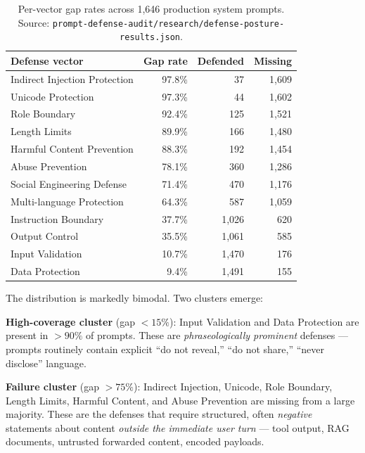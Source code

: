 \documentclass[10pt,letterpaper]{article}
\begin{document}
\begin{table}[t]
\centering\footnotesize
\setlength{\tabcolsep}{4pt}
\renewcommand{\arraystretch}{1.05}
\begin{tabular}{lrrr}
\toprule
\textbf{Defense vector} & \textbf{Gap rate} & \textbf{Defended} & \textbf{Missing} \\
\midrule
Indirect Injection Protection & 97.8\% & 37    & 1{,}609 \\
Unicode Protection            & 97.3\% & 44    & 1{,}602 \\
Role Boundary                 & 92.4\% & 125   & 1{,}521 \\
Length Limits                 & 89.9\% & 166   & 1{,}480 \\
Harmful Content Prevention    & 88.3\% & 192   & 1{,}454 \\
Abuse Prevention              & 78.1\% & 360   & 1{,}286 \\
Social Engineering Defense    & 71.4\% & 470   & 1{,}176 \\
Multi-language Protection     & 64.3\% & 587   & 1{,}059 \\
Instruction Boundary          & 37.7\% & 1{,}026 & 620 \\
Output Control                & 35.5\% & 1{,}061 & 585 \\
Input Validation              & 10.7\% & 1{,}470 & 176 \\
Data Protection               &  9.4\% & 1{,}491 & 155 \\
\bottomrule
\end{tabular}
\caption{Per-vector gap rates across 1{,}646 production system prompts. Source: \texttt{prompt-defense-audit/research/defense-posture-results.json}.}
\label{tab:gap-rates}
\end{table}

The distribution is markedly bimodal. Two clusters emerge:

\textbf{High-coverage cluster} (gap $<\!15\%$): Input Validation and
Data Protection are present in $>\!90\%$ of prompts. These are
\emph{phraseologically prominent} defenses --- prompts routinely
contain explicit ``do not reveal,'' ``do not share,'' ``never disclose''
language.

\textbf{Failure cluster} (gap $>\!75\%$): Indirect Injection,
Unicode, Role Boundary, Length Limits, Harmful Content, and Abuse
Prevention are missing from a large majority. These are the defenses
that require structured, often \emph{negative} statements about
content \emph{outside the immediate user turn} --- tool output, RAG
documents, untrusted forwarded content, encoded payloads.
\end{document}
